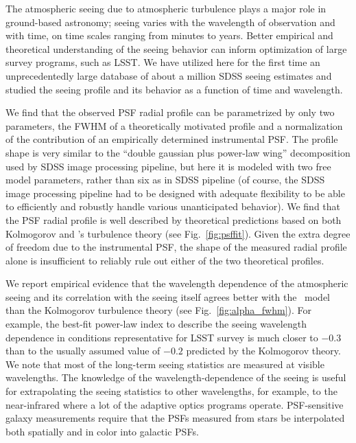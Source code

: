 
 
The atmospheric seeing due to atmospheric turbulence plays a major role in 
ground-based astronomy; seeing varies with the wavelength of observation
and with time, on time scales ranging from minutes to years. Better empirical
and theoretical understanding of the seeing behavior can inform optimization 
of large survey programs, such as LSST. We have utilized here for the first 
time an unprecedentedly large database of about a million SDSS seeing estimates
and studied the seeing profile and its behavior as a function of time and wavelength.

We find that the observed PSF radial profile can be parametrized by only two parameters, 
the FWHM of a theoretically motivated profile and a normalization of the contribution 
of an empirically determined instrumental PSF. The profile shape is very similar to 
the ``double gaussian plus power-law wing'' decomposition used by SDSS image
processing pipeline, but here it is modeled with two free model parameters, rather 
than six as in SDSS pipeline (of course, the SDSS image processing pipeline had
to be designed with adequate flexibility to be able to efficiently and robustly 
handle various unanticipated behavior). We find that the PSF radial profile is well 
described by theoretical predictions based on both 
Kolmogorov and \vk's turbulence theory (see Fig.~\ref{fig:psffit}). Given the extra 
degree of freedom due to the instrumental PSF, the shape of the
measured radial profile alone 
is insufficient to reliably rule out either of the two theoretical profiles.  

We report empirical evidence that the wavelength dependence of the atmospheric 
seeing and its correlation with the seeing itself agrees better with the \vk~model 
than the Kolmogorov turbulence theory (see Fig.~\ref{fig:alpha_fwhm}). For example, 
the best-fit power-law index to describe the seeing wavelength dependence in conditions 
representative for LSST survey is much closer to $-0.3$ than to the usually assumed value
of $-0.2$ predicted by the Kolmogorov theory. 
We note that most of the long-term seeing statistics are measured at visible 
wavelengths. The knowledge of the wavelength-dependence of the seeing is useful 
for extrapolating the seeing statistics to other wavelengths, for example, to
the near-infrared where a lot of the adaptive optics programs operate. 
PSF-sensitive galaxy measurements require that the PSFs measured from
stars be interpolated both spatially and in color into galactic PSFs.

